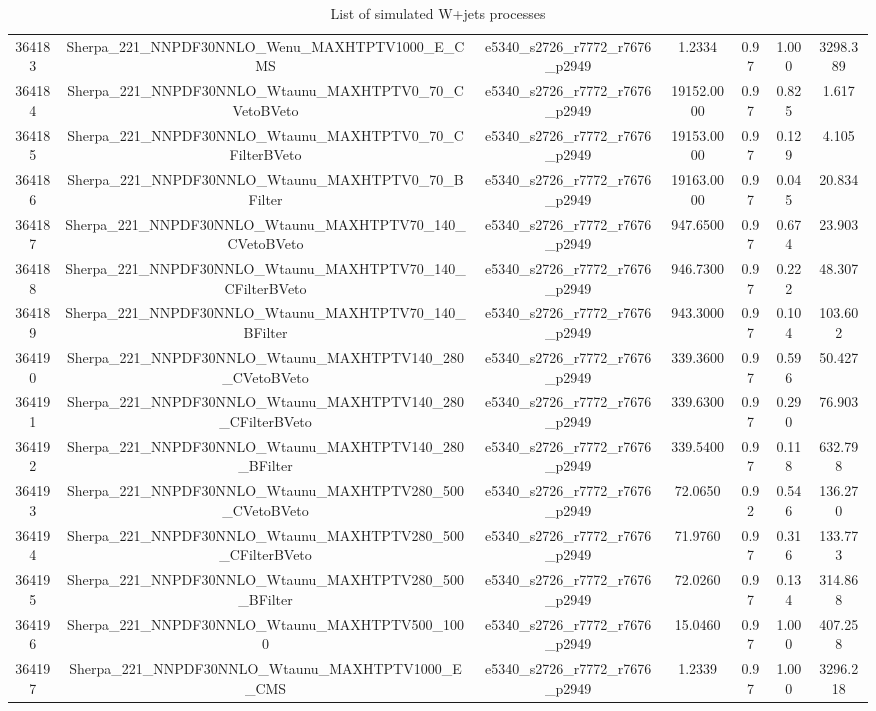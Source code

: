 \begin{table}[htbp]
\begin{center}
{\begin{tabular}{ccccccc}
364183 & Sherpa\_221\_NNPDF30NNLO\_Wenu\_MAXHTPTV1000\_E\_CMS & e5340\_s2726\_r7772\_r7676\_p2949 & 1.2334 & 0.97 & 1.000 & 3298.389 \\ 
364184 & Sherpa\_221\_NNPDF30NNLO\_Wtaunu\_MAXHTPTV0\_70\_CVetoBVeto & e5340\_s2726\_r7772\_r7676\_p2949 & 19152.0000 & 0.97 & 0.825 & 1.617 \\ 
364185 & Sherpa\_221\_NNPDF30NNLO\_Wtaunu\_MAXHTPTV0\_70\_CFilterBVeto & e5340\_s2726\_r7772\_r7676\_p2949 & 19153.0000 & 0.97 & 0.129 & 4.105 \\ 
364186 & Sherpa\_221\_NNPDF30NNLO\_Wtaunu\_MAXHTPTV0\_70\_BFilter & e5340\_s2726\_r7772\_r7676\_p2949 & 19163.0000 & 0.97 & 0.045 & 20.834 \\ 
364187 & Sherpa\_221\_NNPDF30NNLO\_Wtaunu\_MAXHTPTV70\_140\_CVetoBVeto & e5340\_s2726\_r7772\_r7676\_p2949 & 947.6500 & 0.97 & 0.674 & 23.903 \\ 
364188 & Sherpa\_221\_NNPDF30NNLO\_Wtaunu\_MAXHTPTV70\_140\_CFilterBVeto & e5340\_s2726\_r7772\_r7676\_p2949 & 946.7300 & 0.97 & 0.222 & 48.307 \\ 
364189 & Sherpa\_221\_NNPDF30NNLO\_Wtaunu\_MAXHTPTV70\_140\_BFilter & e5340\_s2726\_r7772\_r7676\_p2949 & 943.3000 & 0.97 & 0.104 & 103.602 \\ 
364190 & Sherpa\_221\_NNPDF30NNLO\_Wtaunu\_MAXHTPTV140\_280\_CVetoBVeto & e5340\_s2726\_r7772\_r7676\_p2949 & 339.3600 & 0.97 & 0.596 & 50.427 \\ 
364191 & Sherpa\_221\_NNPDF30NNLO\_Wtaunu\_MAXHTPTV140\_280\_CFilterBVeto & e5340\_s2726\_r7772\_r7676\_p2949 & 339.6300 & 0.97 & 0.290 & 76.903 \\ 
364192 & Sherpa\_221\_NNPDF30NNLO\_Wtaunu\_MAXHTPTV140\_280\_BFilter & e5340\_s2726\_r7772\_r7676\_p2949 & 339.5400 & 0.97 & 0.118 & 632.798 \\ 
364193 & Sherpa\_221\_NNPDF30NNLO\_Wtaunu\_MAXHTPTV280\_500\_CVetoBVeto & e5340\_s2726\_r7772\_r7676\_p2949 & 72.0650 & 0.92 & 0.546 & 136.270 \\ 
364194 & Sherpa\_221\_NNPDF30NNLO\_Wtaunu\_MAXHTPTV280\_500\_CFilterBVeto & e5340\_s2726\_r7772\_r7676\_p2949 & 71.9760 & 0.97 & 0.316 & 133.773 \\ 
364195 & Sherpa\_221\_NNPDF30NNLO\_Wtaunu\_MAXHTPTV280\_500\_BFilter & e5340\_s2726\_r7772\_r7676\_p2949 & 72.0260 & 0.97 & 0.134 & 314.868 \\ 
364196 & Sherpa\_221\_NNPDF30NNLO\_Wtaunu\_MAXHTPTV500\_1000 & e5340\_s2726\_r7772\_r7676\_p2949 & 15.0460 & 0.97 & 1.000 & 407.258 \\ 
364197 & Sherpa\_221\_NNPDF30NNLO\_Wtaunu\_MAXHTPTV1000\_E\_CMS & e5340\_s2726\_r7772\_r7676\_p2949 & 1.2339 & 0.97 & 1.000 & 3296.218 \\ 
\hline
\end{tabular}}
\end{center}
\caption{List of simulated W+jets processes}
\label{table:wjets}
\end{table}

